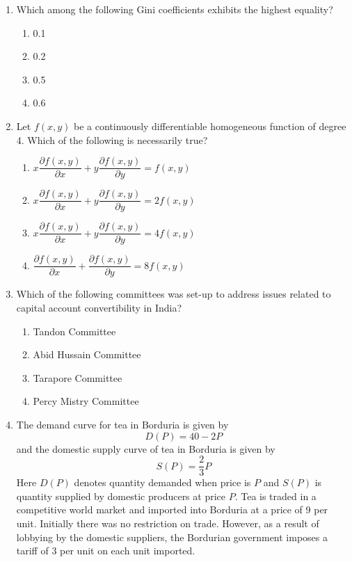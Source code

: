 \documentclass[journal,12pt,onecolumn]{exam}
\theoremstyle{remark}
\begin{document}
\begin{enumerate}
  \item Which among the following Gini coefficients exhibits the highest equality?

  \begin{enumerate}
    \item 0.1
    \item 0.2
    \item 0.5
    \item 0.6
  \end{enumerate}

\newpage
 \item Let $f(x,y)$ be a continuously differentiable homogeneous function of degree 4. Which of the following is necessarily true?

  \begin{enumerate}
    \item $x \dfrac{\partial f(x,y)}{\partial x} + y \dfrac{\partial f(x,y)}{\partial y} = f(x,y)$
    \item $x \dfrac{\partial f(x,y)}{\partial x} + y \dfrac{\partial f(x,y)}{\partial y} = 2f(x,y)$
    \item $x \dfrac{\partial f(x,y)}{\partial x} + y \dfrac{\partial f(x,y)}{\partial y} = 4f(x,y)$
    \item $\dfrac{\partial f(x,y)}{\partial x} + \dfrac{\partial f(x,y)}{\partial y} = 8f(x,y)$
  \end{enumerate}

  \item Which of the following committees was set-up to address issues related to capital account convertibility in India?

  \begin{enumerate}
    \item Tandon Committee
    \item Abid Hussain Committee
    \item Tarapore Committee
    \item Percy Mistry Committee
  \end{enumerate}
  \item The demand curve for tea in Borduria is given by
  \[
  D(P) = 40 - 2P
  \]
  and the domestic supply curve of tea in Borduria is given by
  \[
  S(P) = \frac{2}{3}P
  \]
  Here $D(P)$ denotes quantity demanded when price is $P$ and $S(P)$ is quantity supplied by domestic producers at price $P$. Tea is traded in a competitive world market and imported into Borduria at a price of 9 per unit. Initially there was no restriction on trade. However, as a result of lobbying by the domestic suppliers, the Bordurian government imposes a tariff of 3 per unit on each unit imported. 


\end{enumerate}
\end{document}
